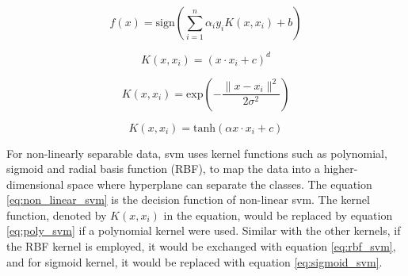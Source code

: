 \begin{figure}[H]
    \begin{minipage}{0.45\linewidth}
        \begin{equation}
            f(x) = \text{sign}(\sum_{i=1}^{n} \alpha_{i}y_{i}K(x,x_{i}) + b) \label{eq:non_linear_svm}
        \end{equation}
    \end{minipage}
    \hfill
    \begin{minipage}{0.45\linewidth}
        \begin{equation}
            K(x,x_{i}) = (x \cdot x_{i} + c)^{d} \label{eq:poly_svm}
        \end{equation}
    \end{minipage}

    \begin{minipage}{0.45\linewidth}
        \begin{equation}
            K(x,x_{i}) = \text{exp}(-\frac{\parallel x - x_{i} \parallel ^ {2}}{2 \sigma ^ {2}}) \label{eq:rbf_svm}
        \end{equation}
    \end{minipage}
    \hfill
    \begin{minipage}{0.45\linewidth}
        \begin{equation}
            K(x,x_{i}) = \text{tanh}(\alpha x \cdot x_{i} + c) \label{eq:sigmoid_svm}
        \end{equation}
    \end{minipage}
\end{figure}
\indent For non-linearly separable data, \gls{svm} uses kernel functions such as polynomial, sigmoid and radial basis function (RBF), to map the data into a higher-dimensional space where hyperplane can separate the classes.
The equation \ref{eq:non_linear_svm} is the decision function of non-linear \gls{svm}. 
The kernel function, denoted by $K(x,x_{i})$ in the equation, would be replaced by equation \ref{eq:poly_svm} if a polynomial kernel were used.
Similar with the other kernels, if the RBF kernel is employed, it would be exchanged with equation \ref{eq:rbf_svm}, and for sigmoid kernel, it would be replaced with equation \ref{eq:sigmoid_svm}.

